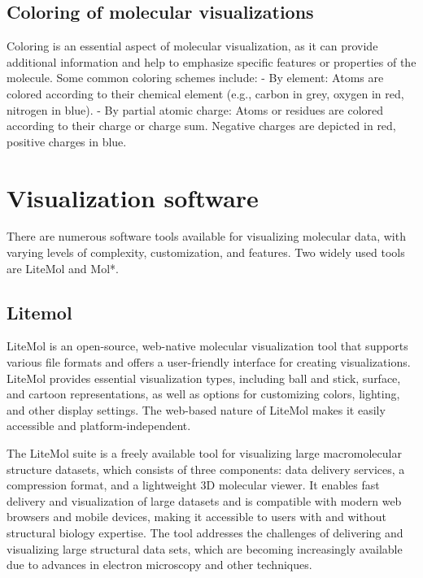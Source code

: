 \documentclass[
  digital,     %
  oneside,     %
  nosansbold,  %
  nocolorbold, %
  lof,         %
  lot,         %
]{fithesis4}
\begin{document}
\subsection{Coloring of molecular visualizations}
\label{subsection:coloring_of_molecular_visualizations}

Coloring is an essential aspect of molecular visualization, as it can provide additional information and help to emphasize specific features or properties of the molecule. Some common coloring schemes include:
- By element: Atoms are colored according to their chemical element (e.g., carbon in grey, oxygen in red, nitrogen in blue).
- By partial atomic charge: Atoms or residues are colored according to their charge or charge sum. Negative charges are depicted in red, positive charges in blue.

\section{Visualization software}
\label{section:visualization_software}

There are numerous software tools available for visualizing molecular data, with varying levels of complexity, customization, and features. Two widely used tools are LiteMol and Mol*.

\subsection{Litemol}
\label{subsection:litemol}

LiteMol is an open-source, web-native molecular visualization tool that supports various file formats and offers a user-friendly interface for creating visualizations. LiteMol provides essential visualization types, including ball and stick, surface, and cartoon representations, as well as options for customizing colors, lighting, and other display settings. The web-based nature of LiteMol makes it easily accessible and platform-independent.

The LiteMol suite is a freely available tool for visualizing large macromolecular structure datasets, which consists of three components: data delivery services, a compression format, and a lightweight 3D molecular viewer. It enables fast delivery and visualization of large datasets and is compatible with modern web browsers and mobile devices, making it accessible to users with and without structural biology expertise. The tool addresses the challenges of delivering and visualizing large structural data sets, which are becoming increasingly available due to advances in electron microscopy and other techniques. \parencite{sehnal-litemol}
\end{document}
